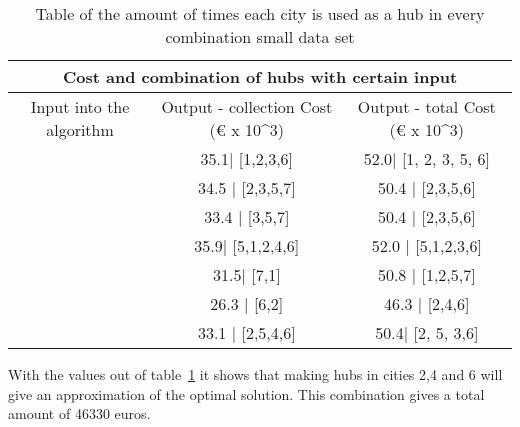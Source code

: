 \documentclass{article}
\begin{document}
               
            \begin{table}[h!]
                \begin{center}
                    \begin{tabular}{||c|c|c||}
                        \hline
                        \multicolumn{3}{||c||}{Cost and combination of hubs with certain input} \\
                        \hline
                        Input into the algorithm & Output -  collection Cost (€ x 10^3) & Output - total Cost (€ x 10^3)\\
                        \hline
                        [1] & 35.1| [1,2,3,6] & 52.0| [1, 2, 3, 5, 6]  \\
                        \hline
                        [2] & 34.5 | [2,3,5,7]   & 50.4 | [2,3,5,6] \\
                        \hline
                        [3]& 33.4 | [3,5,7] & 50.4 |  [2,3,5,6]\\
                        \hline
                        [5] &  35.9| [5,1,2,4,6]  &  52.0 | [5,1,2,3,6] \\
                        \hline
                        [7] &  31.5| [7,1] & 50.8 |  [1,2,5,7] \\
                        \hline
                        [6] & 26.3 | [6,2] & 46.3 |  [2,4,6]\\
                        \hline
                        [2, 5] & 33.1 | [2,5,4,6] & 50.4| [2, 5, 3,6]  \\
                        \hline
                    \end{tabular}
                    \caption{Table of the amount of times each city is used as a hub in every combination small data set}
                \end{center}
            \label{amount of times hubs are used in collection small} 
            \end{table}
            
            With the values out of table~\ref{amount of times hubs are used in collection small} it shows that making hubs in cities 2,4 and 6 will give an approximation of the optimal solution. This combination gives a total amount of 46330 euros.
\end{document}

